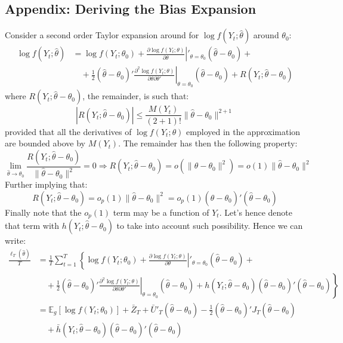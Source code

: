 \subsection{Appendix: Deriving the Bias Expansion}
\label{sec:BiasExpansion}
Consider a second order Taylor expansion around for $\log f(Y_t;\hat{\theta})$ around $\theta_0$:
\begin{align*}
\log f(Y_t;\hat{\theta}) &= \log f(Y_t;\theta_0)+\left.\frac{\partial\log f(Y_t;\theta)}{\partial\theta}\right|'_{\theta=\theta_0} (\widehat{\theta}-\theta_0) +  \\ 
& \quad + \frac{1}{2}(\widehat{\theta}-\theta_0)' \left.\frac{\partial^2\log f(Y_t;\theta)}{\partial\theta\partial\theta'}\right|_{\theta=\theta_0} (\widehat{\theta}-\theta_0) +R(Y_t;\hat{\theta}-\theta_0)
\end{align*}
where $R(Y_t;\hat{\theta}-\theta_0)$, the remainder, is such that:
\[
\left|R(Y_t;\widehat{\theta}-\theta_0)\right|\leq \frac{M(Y_t)}{(2+1)!}\| \widehat{\theta}-\theta_0 \|^{2+1}
\]
provided that all the derivatives of $\log f(Y_t;\theta)$ employed in the approximation are bounded above by $M(Y_t)$. The remainder has then the following property:
\[
\lim_{\widehat{\theta} \rightarrow \theta_0} \frac{R(Y_t;\widehat{\theta}-\theta_0)}{\| \widehat{\theta}-\theta_0 \|^{2}}=0\Rightarrow R(Y_t;\widehat{\theta}-\theta_0)=o(\| \widehat{\theta}-\theta_0 \|^{2})=o(1)\| \widehat{\theta}-\theta_0 \|^{2}
\]
Further implying that:
\[
R(Y_t;\hat{\theta}-\theta_0)=o_p(1)\| \hat{\theta}-\theta_0 \|^{2}=o_p(1)(\widehat{\theta}-\theta_0)'(\widehat{\theta}-\theta_0)
\]
Finally note that the $o_p(1)$ term may be a function of $Y_t$. Let's hence denote that term with $h(Y_t;\hat{\theta}-\theta_0)$ to take into account such possibility. Hence we can write:
\begin{align*}
\frac{\ell_{T}(\widehat{\theta})}{T}&= \frac{1}{T}\sum_{t=1}^{T}\left\{\log f(Y_t;\theta_0)+\left.\frac{\partial\log f(Y_t;\theta)}{\partial\theta}\right|'_{\theta=\theta_0}(\widehat{\theta}-\theta_0) + \right. \\ & \left. \quad +\frac{1}{2}(\widehat{\theta}-\theta_0)' \left.\frac{\partial^2\log f(Y_t;\theta)}{\partial\theta\partial\theta'}\right|_{\theta=\theta_0} (\widehat{\theta}-\theta_0) +h(Y_t;\hat{\theta}-\theta_0)(\widehat{\theta}-\theta_0)'(\widehat{\theta}-\theta_0) \right\}\\
& = \mathbb{E}_g \left[\log f(Y_t;\theta_0) \right]+\bar{Z}_T+\bar{U}'_T  (\widehat{\theta}-\theta_0)  - \frac{1}{2} (\widehat{\theta}-\theta_0)'  J_T  (\widehat{\theta}-\theta_0) \\
&\quad + \bar{h}(Y_t;\hat{\theta}-\theta_0)(\widehat{\theta}-\theta_0)'(\widehat{\theta}-\theta_0)
\end{align*}
